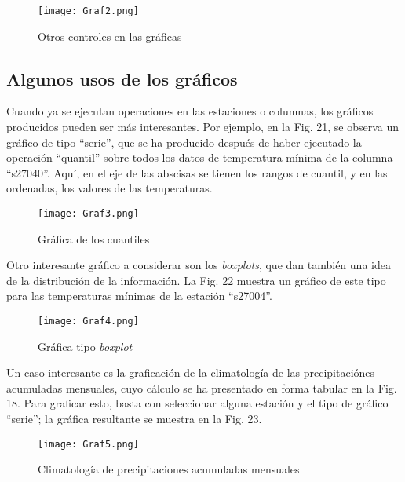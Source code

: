 \documentclass[spanish,]{article}
\begin{document}
\begin{figure}
\centering
\texttt{[image: Graf2.png]}
\caption{Otros controles en las gráficas}
\end{figure}

\subsection{Algunos usos de los
gráficos}\label{algunos-usos-de-los-graficos}

Cuando ya se ejecutan operaciones en las estaciones o columnas, los
gráficos producidos pueden ser más interesantes. Por ejemplo, en la Fig.
21, se observa un gráfico de tipo ``serie'', que se ha producido después
de haber ejecutado la operación ``quantil'' sobre todos los datos de
temperatura mínima de la columna ``s27040''. Aquí, en el eje de las
abscisas se tienen los rangos de cuantil, y en las ordenadas, los
valores de las temperaturas.

\begin{figure}
\centering
\texttt{[image: Graf3.png]}
\caption{Gráfica de los cuantiles}
\end{figure}

Otro interesante gráfico a considerar son los \emph{boxplots}, que dan
también una idea de la distribución de la información. La Fig. 22
muestra un gráfico de este tipo para las temperaturas mínimas de la
estación ``s27004''.

\begin{figure}
\centering
\texttt{[image: Graf4.png]}
\caption{Gráfica tipo \emph{boxplot}}
\end{figure}

Un caso interesante es la graficación de la climatología de las
precipitaciónes acumuladas mensuales, cuyo cálculo se ha presentado en
forma tabular en la Fig. 18. Para graficar esto, basta con seleccionar
alguna estación y el tipo de gráfico ``serie''; la gráfica resultante se
muestra en la Fig. 23.

\begin{figure}
\centering
\texttt{[image: Graf5.png]}
\caption{Climatología de precipitaciones acumuladas mensuales}
\end{figure}
\end{document}
